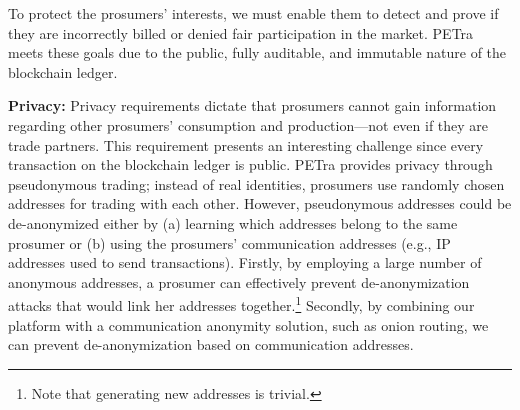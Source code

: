 To protect the prosumers' interests, 
we must enable them to detect and prove if they are incorrectly billed or denied fair participation in the market.
PETra meets these goals due to the public, fully auditable, and immutable nature of the blockchain ledger.

\textbf{Privacy:}
Privacy requirements dictate that prosumers cannot gain information regarding other prosumers' consumption and production---not even if they are trade partners.
This requirement presents an interesting challenge since every transaction on the blockchain ledger is public.
PETra provides privacy through pseudonymous trading; instead of real identities, prosumers use randomly chosen addresses for trading with each other.
However, pseudonymous addresses could be de-anonymized either by (a) learning which addresses belong to the same prosumer or (b) using the prosumers' communication addresses (e.g., IP addresses used to send transactions).
Firstly, by employing a large number of anonymous addresses, a prosumer can effectively prevent de-anonymization attacks that would link her addresses together.\footnote{Note that generating new addresses is trivial.} %
Secondly, by combining our platform with a communication anonymity solution, such as onion routing, we can prevent de-anonymization based on communication addresses.






